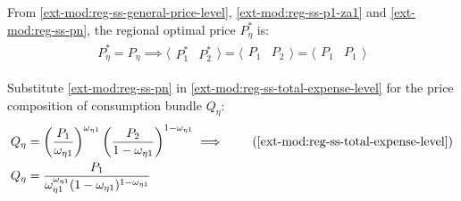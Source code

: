 \documentclass[../thesis.tex]{subfiles}
\begin{document}

From \ref{ext-mod:reg-ss-general-price-level}, \ref{ext-mod:reg-ss-p1-za1} and \ref{ext-mod:reg-ss-pn}, the regional optimal price $P_{\eta}^{\ast}$ is:
\begin{align}
	P_{\eta}^{\ast} = P_{\eta} \implies \langle \begin{matrix} P_{1}^{\ast} & P_{2}^{\ast} \end{matrix} \rangle = \langle \begin{matrix} P_{1} & P_{2} \end{matrix} \rangle = \langle \begin{matrix} P_{1} & P_{1} \end{matrix} \rangle \label{ext-mod:reg-ss-p1-p2}
\end{align}

\begin{comment}

Substitute \ref{ext-mod:reg-ss-p1-p2} and \ref{ext-mod:reg-ss-market-clearing-condition-Yt} in \ref{ext-mod:reg-ss-national-price-level} for the national price level:
\begin{align}
	P_{} &= \frac{P_{1} Y_{1} + P_{2} Y_{2}}{Y_{}} \tag{\ref{ext-mod:reg-ss-national-price-level}} \implies \nonumber \\
	P_{} &= \frac{P_{1} Y_{1} + \theta_{P} P_{1} Y_{2}}{Y_{}} \label{ext-mod:reg-ss-p1-p2-p}
\end{align}
	
\end{comment}



Substitute \ref{ext-mod:reg-ss-pn} in \ref{ext-mod:reg-ss-total-expense-level} for the price composition of consumption bundle $Q_{\eta}$:
\begin{align}
	Q_{\eta} &= \left( \frac{P_{1}}{\omega_{\eta 1}} \right)^{\omega_{\eta 1}} \left( \frac{P_{2}}{1 -\omega_{\eta 1}} \right)^{1 -\omega_{\eta 1}} \implies \tag{\ref{ext-mod:reg-ss-total-expense-level}} \\
	Q_{\eta} &= \frac{ P_{1} }{\omega_{\eta 1}^{\omega_{\eta 1}} (1 - \omega_{\eta 1})^{1 - \omega_{\eta 1}}} \label{ext-mod:reg-ss-q1}
\end{align}

\begin{comment}
	Substitute \ref{ext-mod:reg-ss-q1} in \ref{ext-mod:reg-ss-total-expense-level-2}:
	\begin{align}
		Q_{2} &= Q_{1} \frac{\omega_{11}^{\omega_{11}} (1 - \omega_{11})^{1 - \omega_{11}}}{\omega_{21}^{\omega_{21}} (1 -\omega_{21})^{1 -\omega_{21}}} \tag{\ref{ext-mod:reg-ss-total-expense-level-2}} \implies \\
		Q_{2} &= \frac{P_{1} \theta_{P}^{1 - \omega_{11}}}{\omega_{21}^{\omega_{21}} (1 - \omega_{21})^{1 - \omega_{21}}} \label{ext-mod:reg-ss-q2}
	\end{align}
\end{comment}
\end{document}
